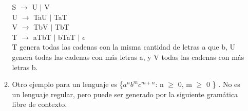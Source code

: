\documentclass[12pt,a4paper,spanish]{book}
\begin{document}
\begin{itemize}
\begin{enumerate}
    S $\rightarrow$ U $\mid$ V\\
    U $\rightarrow$ TaU $\mid$ TaT\\
    V $\rightarrow$ TbV $\mid$ TbT\\
    T $\rightarrow$ aTbT $\mid$ bTaT $\mid$ $\epsilon$\\

T genera todas las cadenas con la misma cantidad de letras a que b, U genera todas las cadenas con m\'as letras a, y V todas las cadenas con m\'as letras b.\\
\item Otro ejemplo para un lenguaje es \{$a^{n} b^{m} c^{m+n}$: n $\ge$ 0, m $\ge$ 0 \} . No es un lenguaje regular, pero puede ser generado por la siguiente gram\'atica libre de contexto.\\


\end{enumerate}
\end{itemize}
\end{document}

